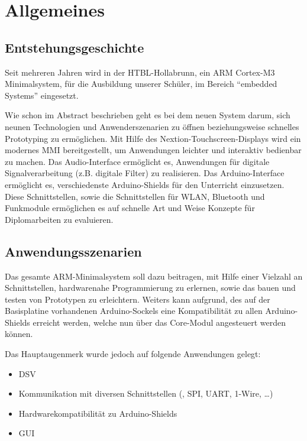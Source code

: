 \section{Allgemeines}
\label{sec:allgemeines}

\subsection{Entstehungsgeschichte}
\label{sec:entstehungsgeschichte}

Seit mehreren Jahren wird in der HTBL-Hollabrunn, ein \gls{ARM} Cortex-M3 \gls{Minimalsystem}, für die Ausbildung unserer Schüler, im Bereich \enquote{embedded Systems} eingesetzt.

Wie schon im Abstract beschrieben geht es bei dem neuen System darum, sich neunen Technologien und Anwenderszenarien zu öffnen beziehungsweise schnelles Prototyping zu ermöglichen. Mit Hilfe des Nextion-Touchscreen-Displays wird ein modernes \gls{MMI} bereitgestellt, um Anwendungen leichter und interaktiv bedienbar zu machen. Das Audio-Interface ermöglicht es, Anwendungen für digitale Signalverarbeitung (z.B. digitale Filter) zu realisieren. Das Arduino-Interface ermöglicht es, verschiedenste Arduino-Shields für den Unterricht einzusetzen. Diese Schnittstellen, sowie die Schnittstellen für WLAN, Bluetooth und Funkmodule ermöglichen es auf schnelle Art und Weise Konzepte für Diplomarbeiten zu evaluieren.

\subsection{Anwendungsszenarien}
\label{sec:anwendungsszenarien}

Das gesamte \gls{ARM}-\gls{Minimalsystem} soll dazu beitragen, mit Hilfe einer Vielzahl an Schnittstellen, hardwarenahe Programmierung zu erlernen, sowie das bauen und testen von Prototypen zu erleichtern. Weiters kann aufgrund, des auf der \gls{Basisplatine} vorhandenen Arduino-Sockels eine Kompatibilität zu allen Arduino-Shields erreicht werden, welche nun über das \gls{Core-Modul} angesteuert werden können.

Das Hauptaugenmerk wurde jedoch auf folgende Anwendungen gelegt:

\begin{itemize}
    \item \gls{DSV}
    \item Kommunikation mit diversen Schnittstellen (\IIC{}, SPI, UART, 1-Wire, \dots{})
    \item Hardwarekompatibilität zu Arduino-Shields
    \item \gls{GUI}
\end{itemize}

